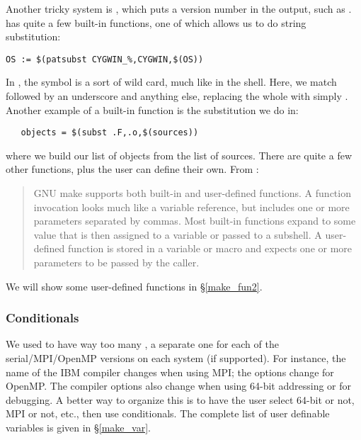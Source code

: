 Another tricky system is , which puts a version number
in the  output, such as .  has
quite a few built-in functions, one of which allows us to do string
substitution:
\begin{verbatim}
OS := $(patsubst CYGWIN_%,CYGWIN,$(OS))
\end{verbatim}
In , the \code{\%} symbol is a sort of wild card, much
like \code{*} in the shell.
Here, we match  followed by an underscore and anything else,
replacing the whole with simply . Another example of a
built-in function is the substitution we do in:
\begin{verbatim}
   objects = $(subst .F,.o,$(sources))
\end{verbatim}
where we build our list of objects from the list of sources.
There are quite a few other functions, plus the user can define
their own. From \cite{GMAKE}:
\begin{quote}
GNU make supports both built-in and user-defined functions.
A function invocation looks much like a variable reference, but
includes one or more parameters separated by commas.  Most built-in
functions expand to some value that is then assigned to a variable
or passed to a subshell. A user-defined function is stored in a
variable or macro and expects one or more parameters to be passed
by the caller.
\end{quote}
We will show some user-defined functions in \S\ref{make_fun2}.

\subsubsection{Conditionals}

We used to have way too many , a separate one for each
of the serial/MPI/OpenMP versions on each system (if supported). For
instance, the name of the IBM compiler changes when using MPI; the
options change for OpenMP. The compiler options also change when using
64-bit addressing or for debugging.
A better way to organize this is to have the user select 64-bit or not, MPI
or not, etc., then use conditionals. The complete list of
user definable  variables is given in \S\ref{make_var}.

